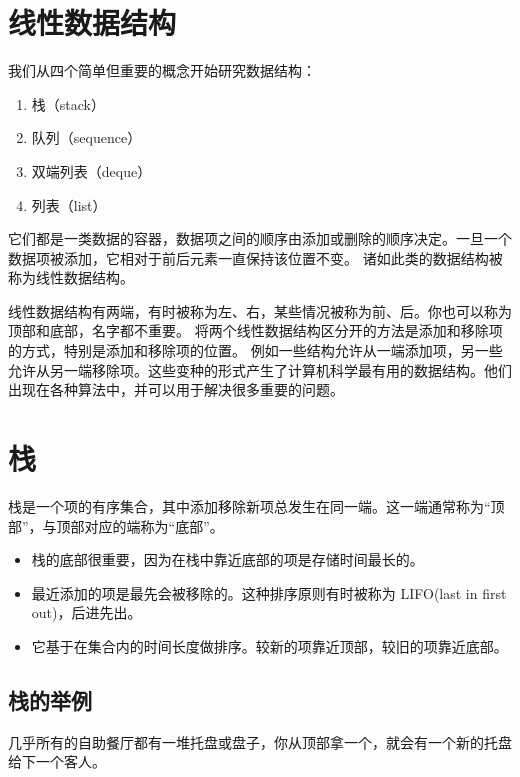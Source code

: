 \documentclass[9pt]{beamer}
\begin{document}
\section{线性数据结构}
\begin{frame}\ft{\secname} 
我们从四个简单但重要的概念开始研究数据结构：
\begin{enumerate}
        \item 栈（stack）
        \item 队列（sequence）
        \item 双端列表（deque）
        \item 列表（list）
\end{enumerate}
它们都是一类数据的容器，数据项之间的顺序由添加或删除的顺序决定。一旦一个数据项被添加，它相对于前后元素一直保持该位置不变。
诸如此类的数据结构被称为线性数据结构。
\end{frame}


\begin{frame}\ft{\secname} 
线性数据结构有两端，有时被称为左、右，某些情况被称为前、后。你也可以称为顶部和底部，名字都不重要。 将两个线性数据结构区分开的方法是添加和移除项的方式，特别是添加和移除项的位置。  例如一些结构允许从一端添加项，另一些允许从另一端移除项。这些变种的形式产生了计算机科学最有用的数据结构。他们出现在各种算法中，并可以用于解决很多重要的问题。
\end{frame}
 
\section{栈}
\begin{frame}\ft{\secname}
栈是一个项的有序集合，其中添加移除新项总发生在同一端。这一端通常称为“顶部”，与顶部对应的端称为“底部”。
\begin{itemize}
        \item 栈的底部很重要，因为在栈中靠近底部的项是存储时间最长的。
        \item 最近添加的项是最先会被移除的。这种排序原则有时被称为 LIFO(last in first out)，后进先出。
        \item 它基于在集合内的时间长度做排序。较新的项靠近顶部，较旧的项靠近底部。
\end{itemize}
\end{frame}
%
\subsection{栈的举例}
\begin{frame}\ft{\subsecname}

\begin{testexample} 
几乎所有的自助餐厅都有一堆托盘或盘子，你从顶部拿一个，就会有一个新的托盘给下一个客人。  
\end{testexample}
\end{frame}
\end{document}
